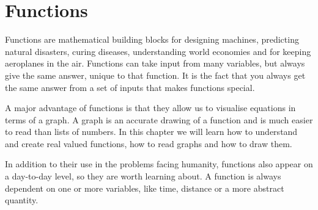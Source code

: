 \chapter{Functions}
\setcounter{figure}{0}
\setcounter{subfigure}{0}

Functions are mathematical building blocks for designing machines, predicting natural disasters, curing diseases, understanding world economies and for keeping aeroplanes in the air. Functions can take input from many variables, but always give the same answer, unique to that function. It is the fact that you always get the same answer from a set of inputs that makes functions special.\par 
A major advantage of functions is that they allow us to visualise equations in terms of a graph. A graph is an accurate drawing of a function and is much easier to read than lists of numbers. In this chapter we will learn how to understand and create real valued functions, how to read graphs and how to draw them.\par 
In addition to their use in the problems facing humanity, functions also appear on a day-to-day level, so they are worth learning about. A function is always dependent on one or more variables, like time, distance or a more abstract quantity.\par 

